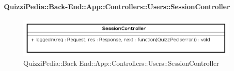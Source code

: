 \paragraph{QuizziPedia::Back-End::App::Controllers::Users::SessionController}
\label{QuizziPedia::Back-End::App::Controllers::Users::SessionController}
\begin{figure}[ht]
	\centering
	\includegraphics[scale=0.45]{UML/Classi/Back-End/QuizziPedia_Back-End_App_Controllers_Users_SessionController.png}
	\caption{QuizziPedia::Back-End::App::Controllers::Users::SessionController}
\end{figure}
\FloatBarrier
